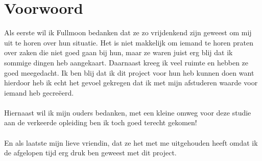 \chapter*{Voorwoord} 

Als eerste wil ik Fullmoon bedanken dat ze zo vrijdenkend zijn geweest om mij uit te horen over hun situatie. Het is niet makkelijk om iemand te horen praten over zaken die niet goed gaan bij hun, maar ze waren juist erg blij dat ik sommige dingen heb aangekaart. Daarnaast kreeg ik veel ruimte en hebben ze goed meegedacht. Ik ben blij dat ik dit project voor hun heb kunnen doen want hierdoor heb ik echt het gevoel gekregen dat ik met mijn afstuderen waarde voor iemand heb gecreëerd.
\\\\
Hiernaast wil ik mijn ouders bedanken, met een kleine omweg voor deze studie aan de verkeerde opleiding ben ik toch goed terecht gekomen!
\\\\
En als laatste mijn lieve vriendin, dat ze het met me uitgehouden heeft omdat ik de afgelopen tijd erg druk ben geweest met dit project.